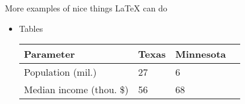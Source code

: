 \documentclass[final]{beamer}\usepackage[]{graphicx}\usepackage[]{color}
\newlength{\sepwid}
\newlength{\onecolwid}
\begin{document}
\begin{frame}[t, fragile]
\begin{columns}[T]
\begin{column}{\onecolwid}
\begin{block}{More examples of nice things \LaTeX{} can do}
\begin{itemize}
							\item Tables
									\begin{table}
									\small
									\centering
									\begin{tabular}{llll}
									\toprule
									\textbf{Parameter} & \textbf{Texas} & \textbf{Minnesota} \\
									\midrule
									Population (mil.) & 27 & 6 \\
									Median income (thou. \$) & 56 & 68\\
									\bottomrule
									\end{tabular}
									\end{table}
					\end{itemize}
				\end{block}
		\end{column} %
		\begin{column}{\sepwid}\end{column} %
	\end{columns} %
\end{frame}
\end{document}

